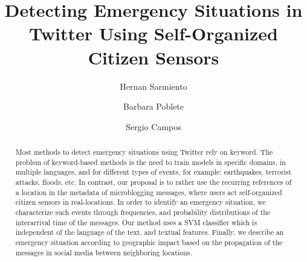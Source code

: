 \documentclass[sigconf]{acmart}
\begin{document}
\title{Detecting Emergency Situations in Twitter Using Self-Organized Citizen Sensors}


\author{Hernan Sarmiento}

\author{Barbara Poblete}

\author{Sergio Campos}





\begin{abstract}

Most methods to detect emergency situations using Twitter rely on keyword. The problem of keyword-based methods is the need to train models in specific domains, in multiple languages, and for different types of events, for example: earthquakes, terrorist attacks, floods, etc. In contrast, our proposal is to rather use the recurring references of a location in the metadata of microblogging messages, where users act self-organized citizen sensors in real-locations. In order to identify an emergency situation, we characterize  such events  through frequencies, and probability distributions of the interarrival time of the messages. Our method uses a SVM classifier which is independent of the language of the text, and textual features. Finally, we describe an emergency situation according to geographic impact based on the propagation of the messages in social media between neighboring locations.
\end{abstract}
\end{document}
